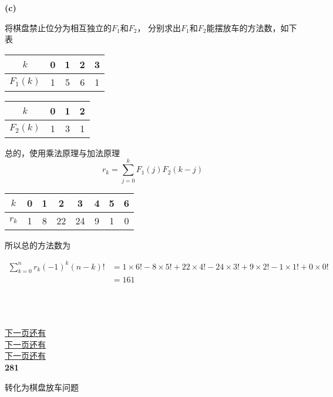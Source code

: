 \documentclass[UTF8]{ctexart}
\begin{document}
\textbf{(c)  }

将棋盘禁止位分为相互独立的$F_1$和$F_2$，
分别求出$F_1$和$F_2$能摆放车的方法数，如下表

\begin{table}[h]
  \centering
  \begin{tabular}{c|cccc} 
  \hline
  $k$       & 0 & 1 & 2 & 3  \\ 
  \hline
  $F_1(k)$ & 1 & 5 & 6 & 1  \\
  \hline
  \end{tabular}

  \begin{tabular}{c|ccc} 
    \hline
    $k$       & 0 & 1 & 2   \\ 
    \hline
    $F_2(k)$ & 1 & 3 & 1   \\
    \hline
    \end{tabular}
\end{table}

总的，使用乘法原理与加法原理
$$r_k = \sum_{j=0}^{k} F_1(j) F_2(k-j)$$


\begin{table}[h]
  \centering
  \begin{tabular}{c|ccccccc} 
  \hline
  $k$    & 0 & 1 & 2  & 3  & 4 & 5 & 6  \\ 
  \hline
  $r_k$ & 1 & 8 & 22 & 24 & 9 & 1 & 0  \\
  \hline
  \end{tabular}
\end{table}

所以总的方法数为

\begin{equation}
  \nonumber
  \begin{aligned}
    \sum_{k=0}^{n} r_k (-1)^k (n-k)! &=
     1 \times 6! - 8 \times 5! + 22 \times 4!
      - 24 \times 3! + 9 \times 2! - 1 \times 1! 
      + 0 \times 0!\\
      &= 161
  \end{aligned}
\end{equation}

~\\
~\\
~\\
\underline{下一页还有}\\
\underline{下一页还有}\\
\underline{下一页还有}\\

\newpage
\noindent\textbf{281}

转化为棋盘放车问题
\end{document}
